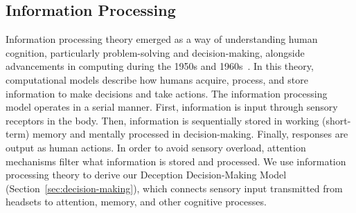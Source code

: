 \subsection{Information Processing}
\label{sec:information-processing}
Information processing theory emerged as a way of understanding human cognition, particularly problem-solving and decision-making, alongside advancements in computing during the 1950s and 1960s~\cite{simon1979information}. 
In this theory, computational models describe how humans acquire, process, and store information to make decisions and take actions. %
The information processing model operates in a serial manner.
First, information is input through sensory receptors in the body. 
Then, information is sequentially stored in working (short-term) memory and mentally processed in decision-making.
Finally, responses are output as human actions.
In order to avoid sensory overload, attention mechanisms filter what information is stored and processed.
We use information processing theory to derive our \MR Deception Decision-Making Model (Section~\ref{sec:decision-making}), which connects sensory input transmitted from \MR headsets to attention, memory, and other cognitive processes.



